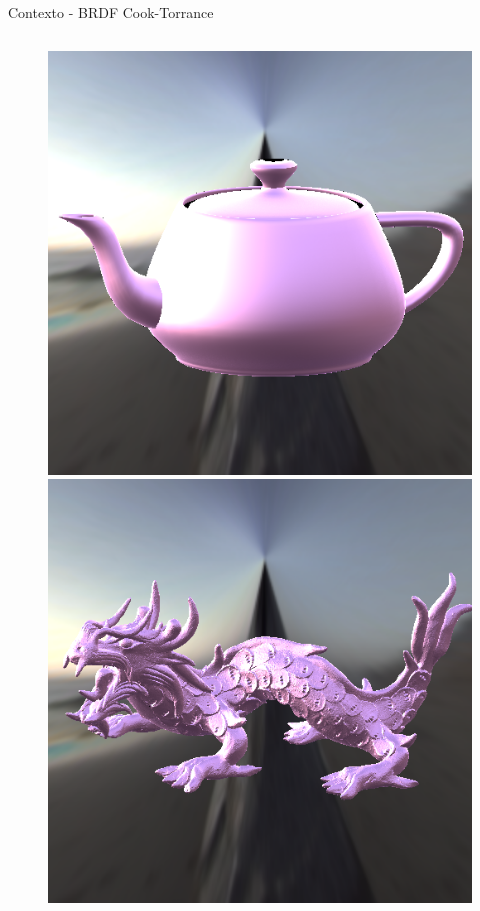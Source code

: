 \begin{frame}{Contexto - BRDF Cook-Torrance}
\begin{columns}
        \vspace{-0.50cm}
        \begin{figure}[H]
            \centering
            \includegraphics[height=0.32\textheight]{./Imagens/brdfs/cook-torrance-alternative-teapot.png}
            
            
            \includegraphics[height=0.32\textheight]{./Imagens/brdfs/cook-torrance-alternative-dragon.png}
            

\end{figure}
\end{columns}
\end{frame}
